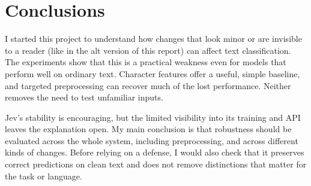 \section{Conclusions}

I started this project to understand how changes that look minor or are invisible to a reader (like in the alt version of this report) can affect text classification. The experiments show that this is a practical weakness even for models that perform well on ordinary text. Character features offer a useful, simple baseline, and targeted preprocessing can recover much of the lost performance. Neither removes the need to test unfamiliar inputs.

Jev's stability is encouraging, but the limited visibility into its training and API leaves the explanation open. My main conclusion is that robustness should be evaluated across the whole system, including preprocessing, and across different kinds of changes. Before relying on a defense, I would also check that it preserves correct predictions on clean text and does not remove distinctions that matter for the task or language.

